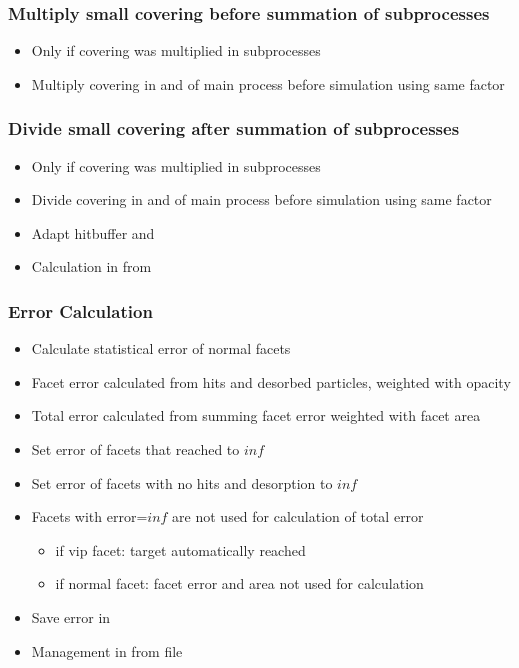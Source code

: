 \subsubsection{Multiply small covering before summation of subprocesses}
\begin{itemize}[noitemsep,topsep=0pt, partopsep=0pt]
\item Only if covering was multiplied in subprocesses
\item Multiply covering in  and  of main process before simulation using same factor
\end{itemize}

\subsubsection{Divide small covering after  summation of subprocesses}
\begin{itemize}[noitemsep,topsep=0pt, partopsep=0pt]
\item Only if covering was multiplied in subprocesses
\item Divide covering in  and  of main process before simulation using same factor
\item Adapt hitbuffer and 
\item Calculation in  from 
\end{itemize}

\subsubsection{Error Calculation}
\begin{itemize}[noitemsep,topsep=0pt, partopsep=0pt]
\item Calculate statistical error of normal facets
\item Facet error calculated from hits and desorbed particles, weighted with opacity
\item Total error calculated from summing facet error weighted with facet area
\item Set error of facets that reached  to $inf$
\item Set error of facets with no hits and desorption to $inf$
\item Facets with error=$inf$ are not used for calculation of total error
\begin{itemize}[noitemsep,topsep=0pt, partopsep=0pt]
\item if vip facet: target automatically reached
\item if normal facet: facet error and area not used for calculation
\end{itemize}
\item Save error in 
\item Management in  from  file
\end{itemize}

